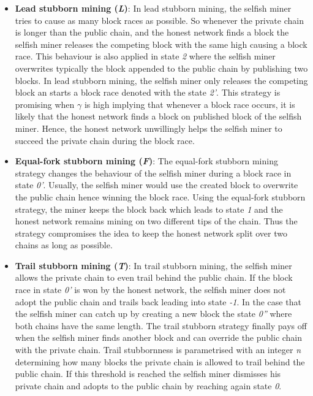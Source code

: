 \begin{itemize}
	\item \textbf{Lead stubborn mining (\textit{L})}:
	In lead stubborn mining, the selfish miner tries to cause as many block races as possible.
	So whenever the private chain is longer than the public chain, and the honest network finds a block the selfish miner releases the competing block with the same high causing a block race.
	This behaviour is also applied in state \textit{2} where the selfish miner overwrites typically the block appended to the public chain by publishing two blocks.
	In lead stubborn mining, the selfish miner only releases the competing block an starts a block race denoted with the state \textit{2'}.
	This strategy is promising when $\gamma$ is high implying that whenever a block race occurs, it is likely that the honest network finds a block on published block of the selfish miner. 
	Hence, the honest network unwillingly helps the selfish miner to succeed the private chain during the block race.
	\item \textbf{Equal-fork stubborn mining (\textit{F})}:
	The equal-fork stubborn mining strategy changes the behaviour of the selfish miner during a block race in state \textit{0'}.
	Usually, the selfish miner would use the created block to overwrite the public chain hence winning the block race.
	Using the equal-fork stubborn strategy, the miner keeps the block back which leads to state \textit{1} and the honest network remains mining on two different tips of the chain.
	Thus the strategy compromises the idea to keep the honest network split over two chains as long as possible.
	\item \textbf{Trail stubborn mining (\textit{T})}:
	In trail stubborn mining, the selfish miner allows the private chain to even trail behind the public chain.
	If the block race in state \textit{0'} is won by the honest network, the selfish miner does not adopt the public chain and trails back leading into state \textit{-1}.
	In the case that the selfish miner can catch up by creating a new block the state \textit{0''} where both chains have the same length.
	The trail stubborn strategy finally pays off when the selfish miner finds another block and can override the public chain with the private chain.
	Trail stubbornness is parametrised with an integer \textit{n} determining how many blocks the private chain is allowed to trail behind the public chain.
	If this threshold is reached the selfish miner dismisses his private chain and adopts to the public chain by reaching again state \textit{0}.
\end{itemize}

